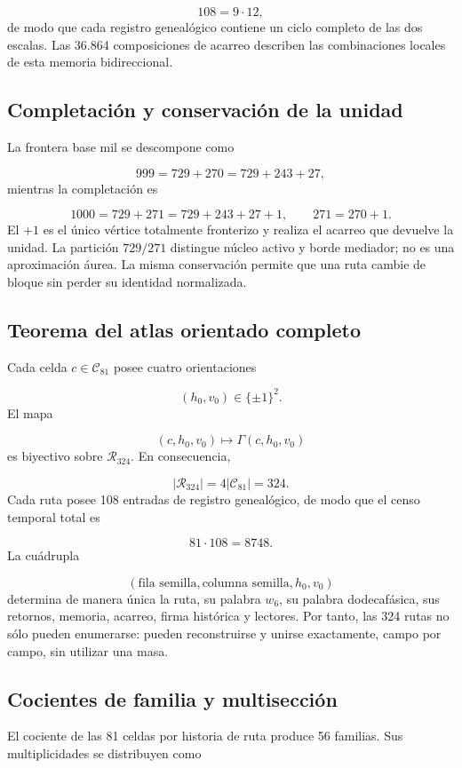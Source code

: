 \[
 108=9\cdot12,
\]
de modo que cada registro genealógico contiene un ciclo completo de las dos escalas. Las 36.864 composiciones de acarreo describen las combinaciones locales de esta memoria bidireccional.

\subsection{Completación y conservación de la unidad}
La frontera base mil se descompone como

\[
 999=729+270=729+243+27,
\]
mientras la completación es

\[
 1000=729+271=729+243+27+1,
\qquad
 271=270+1.
\]
El \(+1\) es el único vértice totalmente fronterizo y realiza el acarreo que devuelve la unidad. La partición \(729/271\) distingue núcleo activo y borde mediador; no es una aproximación áurea. La misma conservación permite que una ruta cambie de bloque sin perder su identidad normalizada.

\subsection{Teorema del atlas orientado completo}
Cada celda \(c\in\mathcal C_{81}\) posee cuatro orientaciones

\[
 (h_0,v_0)\in\{\pm1\}^2.
\]
El mapa

\[
 (c,h_0,v_0)\longmapsto\Gamma(c,h_0,v_0)
\]
es biyectivo sobre \(\mathcal R_{324}\). En consecuencia,

\[
 |\mathcal R_{324}|=4|\mathcal C_{81}|=324.
\]
Cada ruta posee 108 entradas de registro genealógico, de modo que el censo temporal total es

\[
 81\cdot108=8748.
\]
La cuádrupla

\[
 (\text{fila semilla},\text{columna semilla},h_0,v_0)
\]
determina de manera única la ruta, su palabra \(w_6\), su palabra dodecafásica, sus retornos, memoria, acarreo, firma histórica y lectores. Por tanto, las 324 rutas no sólo pueden enumerarse: pueden reconstruirse y unirse exactamente, campo por campo, sin utilizar una masa.

\subsection{Cocientes de familia y multisección}
El cociente de las 81 celdas por historia de ruta produce 56 familias. Sus multiplicidades se distribuyen como

